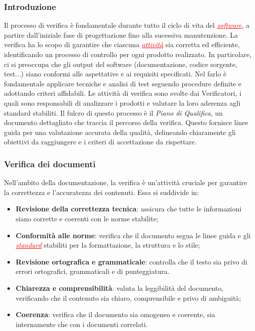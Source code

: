 \subsubsection{Introduzione}
Il processo di verifica è fondamentale durante tutto il ciclo di vita del \textcolor{red}{\uline{\textit{software}}}, a partire dall'iniziale fase
di progettazione fino alla sucessiva manutenzione. La verifica ha lo scopo di garantire che ciascuna \textcolor{red}{\uline{\textit{attività}}}
sia corretta ed efficiente, identificando un processo di controllo per ogni prodotto realizzato. In particolare, ci si preoccupa che gli output
del software (documentazione, codice sorgente, test...) siano conformi alle aspettative e ai requisiti specificati. Nel farlo è fondamentale
applicare tecniche e analisi di test seguendo procedure definite e adottando criteri affidabili.
Le attività di verifica sono svolte dai Verificatori, i quali sono responsabili di analizzare i prodotti e valutare la loro aderenza agli standard
stabiliti. Il fulcro di questo processo è il \textit{Piano di Qualifica}, un documento dettagliato che traccia il percorso della verifica.
Questo fornisce linee guida per una valutazione accurata della qualità, delineando chiaramente gli obiettivi da raggiungere e i criteri di
accettazione da rispettare.

\subsubsection{Verifica dei documenti} \label{verifica_dei_documenti}
Nell'ambito della documentazione, la verifica è un'attività cruciale per garantire la correttezza e l'accuratezza dei contenuti. Essa si suddivide in:
\begin{itemize}
    \item \textbf{Revisione della correttezza tecnica}: assicura che tutte le informazioni siano corrette e coerenti con le norme stabilite;
    \item \textbf{Conformità alle norme}: verifica che il documento segua le linee guida e gli \textcolor{red}{\uline{\textit{standard}}} 
        stabiliti per la formattazione, la struttura e lo stile;
    \item \textbf{Revisione ortografica e grammaticale}: controlla che il testo sia privo di errori ortografici, grammaticali e di punteggiatura.
    \item \textbf{Chiarezza e comprensibilità}: valuta la leggibilità del documento, verificando che il contenuto sia chiaro, comprensibile e privo di ambiguità;
    \item \textbf{Coerenza}: verifica che il documento sia omogeneo e coerente, sia internamente che con i documenti correlati.
\end{itemize}

